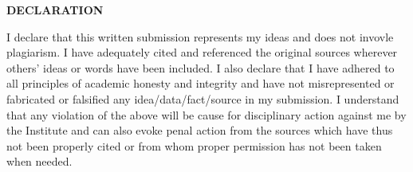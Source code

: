 
\certificate
\makeapproval




\begin{declaration}
\begin{center}
\Large \bf {DECLARATION}
\end{center}

\noindent
I declare that this written submission represents my ideas and does not invovle plagiarism.  I have
adequately cited and referenced the original sources wherever others' ideas or words have been included. I also declare
that I have adhered to all principles of academic honesty and
integrity and have not misrepresented or fabricated or falsified any
idea/data/fact/source in my submission. I understand that any
violation of the above will be cause for disciplinary action against me by the
Institute and can also evoke penal action from the sources which
have thus not been properly cited or from whom proper permission has
not been taken when needed.

\end{declaration}








